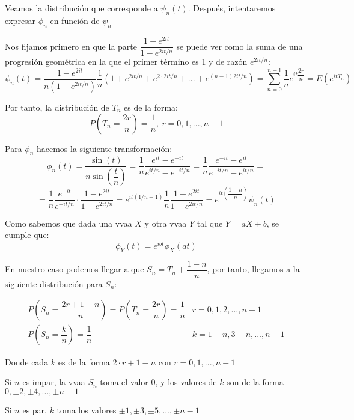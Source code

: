 \documentclass[openany]{book}
\begin{document}
\begin{exercise}




Veamos la distribución que corresponde a $ \psi_n(t) $. Después, intentaremos expresar $ \phi_n $ en función de $ \psi_n $

Nos fijamos primero en que la parte $ \dfrac{1-e^{2it}}{1-e^{2it/n}} $ se puede ver como la suma de una progresión geométrica en la que el primer término es 1 y de razón $ e^{2it/n} $:
$$ \psi_n(t) = \dfrac{1-e^{2it}}{n(1-e^{2it/n})} \dfrac{1}{n} (1+e^{2it/n} + e^{2\cdot 2it/n} + ... + e^{(n-1)2it/n}) = \sum\limits_{n=0}^{n-1}\dfrac{1}{n} e^{it \dfrac{2r}{n}} = E(e^{itT_n}) $$

Por tanto, la distribución de $ T_n $ es de la forma:
$$ P(T_n = \dfrac{2r}{n}) = \dfrac{1}{n},\ r = 0,1,...,n-1 $$

Para $ \phi_n $ hacemos la siguiente transformación:
$$ \phi_n(t) = \dfrac{\sin(t)}{n \sin(\dfrac{t}{n})} = \dfrac{1}{n} \dfrac{e^{it}-e^{-it}}{e^{it/n}-e^{-it/n}} = \dfrac{1}{n} \dfrac{e^{-it}-e^{it}}{e^{-it/n}-e^{it/n}} = $$
$$ = \dfrac{1}{n} \dfrac{e^{-it}}{e^{-it/n}} \cdot  \dfrac{1-e^{2it}}{1-e^{2it/n}} = e^{it(1/n-1)} \dfrac{1}{n} \dfrac{1-e^{2it}}{1-e^{2it/n}} = e^{it(\dfrac{1-n}{n})} \psi_n(t) $$

Como sabemos que dada una vvaa $ X $ y otra vvaa $ Y $ tal que $ Y = aX+b $, se cumple que:
$$ \phi_{Y}(t) = e^{ibt}\phi_{X}(at) $$

En nuestro caso podemos llegar a que $ S_n = T_n+ \dfrac{1-n}{n} $, por tanto, llegamos a la siguiente distribución para $ S_n $:

$$ 
\begin{matrix}
    P(S_n = \dfrac{2r+1-n}{n}) = P(T_n = \dfrac{2r}{n}) = \dfrac{1}{n} &  r = 0,1,2,...,n-1 \\
    P(S_n = \dfrac{k}{n}) = \dfrac{1}{n} & k = 1-n,3-n,...,n-1
\end{matrix}
$$

Donde cada $ k  $ es de la forma $ 2\cdot r+1-n $ con $ r = 0,1,...,n-1 $


Si $ n $ es impar, la vvaa $ S_n $ toma el valor 0, y los valores de $ k  $ son de la forma $ 0,\pm 2,\pm  4,...,\pm n-1 $

Si $ n  $ es par, $ k $ toma los valores $ \pm 1,\pm 3,\pm 5,...,\pm n-1 $

    
\end{exercise}
\end{document}
